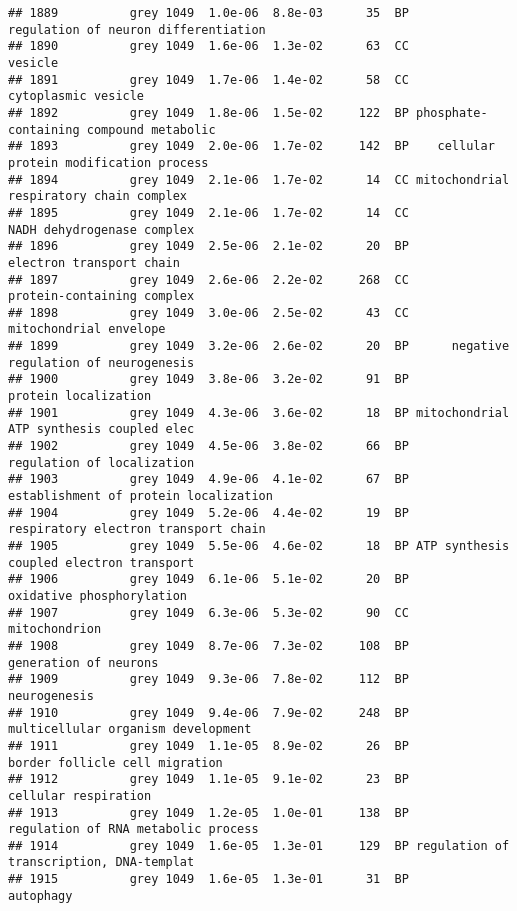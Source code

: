\documentclass[]{article}
\begin{document}
\begin{verbatim}
## 1889          grey 1049  1.0e-06  8.8e-03      35  BP     regulation of neuron differentiation
## 1890          grey 1049  1.6e-06  1.3e-02      63  CC                                  vesicle
## 1891          grey 1049  1.7e-06  1.4e-02      58  CC                      cytoplasmic vesicle
## 1892          grey 1049  1.8e-06  1.5e-02     122  BP phosphate-containing compound metabolic 
## 1893          grey 1049  2.0e-06  1.7e-02     142  BP    cellular protein modification process
## 1894          grey 1049  2.1e-06  1.7e-02      14  CC mitochondrial respiratory chain complex 
## 1895          grey 1049  2.1e-06  1.7e-02      14  CC               NADH dehydrogenase complex
## 1896          grey 1049  2.5e-06  2.1e-02      20  BP                 electron transport chain
## 1897          grey 1049  2.6e-06  2.2e-02     268  CC               protein-containing complex
## 1898          grey 1049  3.0e-06  2.5e-02      43  CC                   mitochondrial envelope
## 1899          grey 1049  3.2e-06  2.6e-02      20  BP      negative regulation of neurogenesis
## 1900          grey 1049  3.8e-06  3.2e-02      91  BP                     protein localization
## 1901          grey 1049  4.3e-06  3.6e-02      18  BP mitochondrial ATP synthesis coupled elec
## 1902          grey 1049  4.5e-06  3.8e-02      66  BP               regulation of localization
## 1903          grey 1049  4.9e-06  4.1e-02      67  BP    establishment of protein localization
## 1904          grey 1049  5.2e-06  4.4e-02      19  BP     respiratory electron transport chain
## 1905          grey 1049  5.5e-06  4.6e-02      18  BP ATP synthesis coupled electron transport
## 1906          grey 1049  6.1e-06  5.1e-02      20  BP                oxidative phosphorylation
## 1907          grey 1049  6.3e-06  5.3e-02      90  CC                            mitochondrion
## 1908          grey 1049  8.7e-06  7.3e-02     108  BP                    generation of neurons
## 1909          grey 1049  9.3e-06  7.8e-02     112  BP                             neurogenesis
## 1910          grey 1049  9.4e-06  7.9e-02     248  BP       multicellular organism development
## 1911          grey 1049  1.1e-05  8.9e-02      26  BP           border follicle cell migration
## 1912          grey 1049  1.1e-05  9.1e-02      23  BP                     cellular respiration
## 1913          grey 1049  1.2e-05  1.0e-01     138  BP      regulation of RNA metabolic process
## 1914          grey 1049  1.6e-05  1.3e-01     129  BP regulation of transcription, DNA-templat
## 1915          grey 1049  1.6e-05  1.3e-01      31  BP                                autophagy

\end{verbatim}
\end{document}
